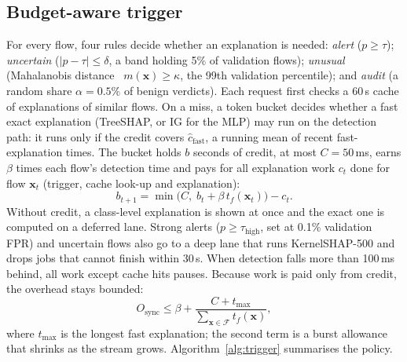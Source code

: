 \documentclass[pdflatex,iicol,sn-mathphys-num]{sn-jnl}
\begin{document}
\subsection{Budget-aware trigger}
For every flow, four rules decide whether an explanation is needed: \emph{alert} ($p\ge\tau$); \emph{uncertain} ($|p-\tau|\le\delta$, a band holding 5\% of validation flows); \emph{unusual} (Mahalanobis distance~\cite{ledoit2004} $m(\mathbf{x})\ge\kappa$, the 99th validation percentile); and \emph{audit} (a random share $\alpha=0.5\%$ of benign verdicts). Each request first checks a 60\,s cache of explanations of similar flows. On a miss, a token bucket decides whether a fast exact explanation (TreeSHAP, or IG for the MLP) may run on the detection path: it runs only if the credit covers $\hat{c}_{\mathrm{fast}}$, a running mean of recent fast-explanation times. The bucket holds $b$ seconds of credit, at most $C=50$\,ms, earns $\beta$ times each flow's detection time and pays for all explanation work $c_t$ done for flow $\mathbf{x}_t$ (trigger, cache look-up and explanation):
\begin{equation}
b_{t+1}=\min\big(C,\;b_t+\beta\,t_f(\mathbf{x}_t)\big)-c_t.\label{eq:bucket}
\end{equation}
Without credit, a class-level explanation is shown at once and the exact one is computed on a deferred lane. Strong alerts ($p\ge\tau_{\mathrm{high}}$, set at 0.1\% validation FPR) and uncertain flows also go to a deep lane that runs KernelSHAP-500 and drops jobs that cannot finish within 30\,s. When detection falls more than 100\,ms behind, all work except cache hits pauses. Because work is paid only from credit, the overhead stays bounded:
\begin{equation}
O_{\mathrm{sync}}\le\beta+\frac{C+t_{\max}}{\sum_{\mathbf{x}\in\mathcal{F}}t_f(\mathbf{x})},\label{eq:bound}
\end{equation}
where $t_{\max}$ is the longest fast explanation; the second term is a burst allowance that shrinks as the stream grows. Algorithm~\ref{alg:trigger} summarises the policy.
\end{document}
